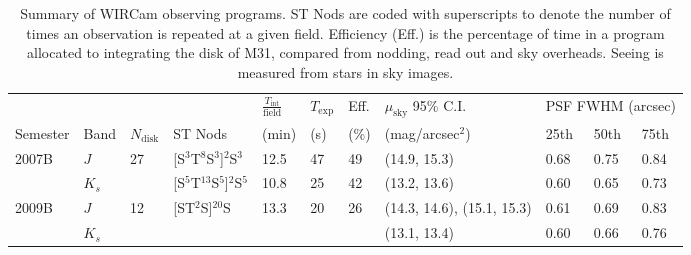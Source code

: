\documentclass[iop]{emulateapj}
\begin{document}

\begin{table}[t]
    \caption[Summary of WIRCam observing programs]{Summary of WIRCam observing programs. ST Nods are coded with superscripts to denote the number of times an observation is repeated at a given field. Efficiency (Eff.) is the percentage of time in a program allocated to integrating the disk of M31, compared from nodding, read out and sky overheads. Seeing is measured from stars in sky images.}
    \label{tab:obssummary}
    
    \centering
    \begin{tabular}{lllllllllll}
        & & & & $\frac{T_\mathrm{int}}{\mathrm{field}}$ & $T_\mathrm{exp}$ & Eff. & $\mu_\mathrm{sky}$ 95\% C.I. & \multicolumn{3}{c}{PSF FWHM (arcsec)} \\ \cline{9-11}
    Semester & Band & $N_\mathrm{disk}$ & ST Nods & (min) &  (s) &  (\%) & (mag/arcsec$^2$) & 25th  & 50th & 75th \\
    \hline
    \multirow{2}{*}{2007B} & $J$ & \multirow{2}{*}{27} & [S$^3$T$^8$S$^3$]$^{2}$S$^3$ & 12.5 & 47 & 49 & (14.9, 15.3) & 0.68 & 0.75 & 0.84 \\
     & $K_s$ &  & [S$^5$T$^{13}$S$^5$]${^2}$S$^5$ & 10.8 & 25 & 42 & (13.2, 13.6) & 0.60 &  0.65 & 0.73 \\
     \hline
     \multirow{2}{*}{2009B} & $J$ & \multirow{2}{*}{12} & \multirow{2}{*}{[ST$^2$S]$^{20}$S} & \multirow{2}{*}{13.3} & \multirow{2}{*}{20} & \multirow{2}{*}{26} & (14.3, 14.6), (15.1, 15.3) & 0.61 & 0.69 & 0.83 \\
      & $K_s$ & & & & & & (13.1, 13.4) & 0.60 & 0.66 & 0.76 \\
    \end{tabular}
\end{table}

\end{document}
